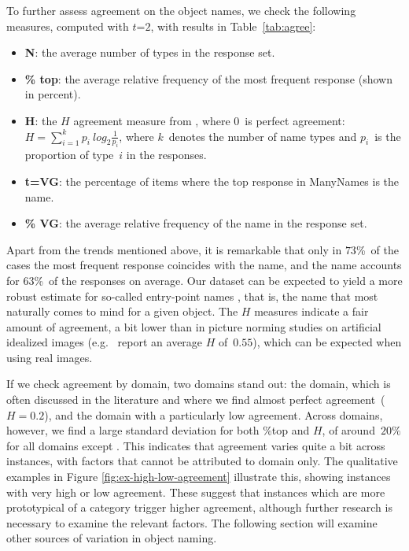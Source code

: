 To further assess agreement on the object names, we check the following measures, computed with \mbox{$t$=$2$}, with results in Table~\ref{tab:agree}:
\begin{itemize}
\item \textbf{N}: the average number of types in the response set. %
\item \textbf{\% top}: the average relative frequency of the most frequent response (shown in percent).
\item $\mathbf{H}$: the $H$ agreement measure from \cite{snodgrass}, where $0$~is perfect agreement: \mbox{$H = \sum_{i=1}^k p_i~log_2\frac{1}{p_i}$}, 
where $k$~denotes the number of name types and $p_i$~is the proportion of type~$i$ in the responses. 
\item \textbf{t=VG}: the percentage of items where the top response in ManyNames is the \vg name.
\item \textbf{\% VG}: the average relative frequency of the \vg name in the response set.
\end{itemize}

Apart from the trends mentioned above, it is remarkable that only in $73$\%~of the cases the most frequent response coincides with the \vg name, and the \vg name accounts for $63$\%~of the responses on average.
Our dataset can be expected to yield a more robust estimate for so-called entry-point names \cite{jolicoeur1984pictures}, that is, the name that most naturally comes to mind for a given object.
The $H$ measures indicate a fair amount of agreement, a bit lower than in picture norming studies on artificial idealized images (e.g.\  report an average $H$ of~$0.55$), which can be expected when using real images.

If we check agreement by domain, two domains stand out: the  domain, which is often discussed in the literature and where we find almost perfect agreement\ (\mbox{$H=0.2$}), and the  domain with a particularly low agreement.
Across domains, however, we find a large standard deviation for both \%top and $H$, of around\ $20\%$ for all domains except .
This indicates that agreement varies quite a bit across instances, with factors that cannot be attributed to domain only.
The qualitative examples in Figure \ref{fig:ex-high-low-agreement} illustrate this, showing instances with very high or low agreement.
These suggest that instances which are more prototypical of a category trigger higher agreement, although further research is necessary to examine the relevant factors.
The following section will examine other sources of variation in object naming.

